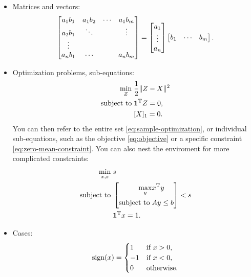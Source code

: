 \documentclass[letterpaper, 10 pt, conference]{ieeeconf}
\begin{document}
\begin{itemize}
\item Matrices and vectors:
  \begin{equation}
    \begin{bmatrix}
      a_1b_1 & a_1b_2 & \cdots &a_1 b_m\\
      a_2b_1 & \ddots && \vdots\\
      \vdots\\
      a_nb_1&\cdots&&a_nb_m
    \end{bmatrix}=\begin{bmatrix}a_1\\\vdots\\a_n\end{bmatrix}\begin{bmatrix}b_1 & \cdots & b_m\end{bmatrix}.
  \end{equation}
\item Optimization problems, sub-equations:
  \begin{subequations}
    \label{eq:sample-optimization}
    \begin{align}
      \min_{Z}\; & \frac{1}{2}\lVert Z-X\rVert^2\label{eq:objective}\\
      \textrm{subject to}\; &   \mathbf{1}^\mathrm{T} Z=0,\label{eq:zero-mean-constraint}\\
                 & [X]_1=0.
    \end{align}
  \end{subequations}
  You can then refer to the entire set \eqref{eq:sample-optimization}, or individual sub-equations, such as the objective \eqref{eq:objective} or a specific constraint \eqref{eq:zero-mean-constraint}.
  You can also nest the  enviroment for more complicated constraints:
  \begin{equation}
    \label{eq:sample-optimization-complex}
    \begin{aligned}
      \min_{x,s}\; & s\\
      \textrm{subject to}\; & \left[
                   \begin{aligned}
                           \max_y &x^\mathrm{T} y\\
                           \textrm{subject to}\; & Ay\leq b
                         \end{aligned}
                   \right]<s\\
                 & \mathbf{1}^\mathrm{T} x=1.
    \end{aligned}
  \end{equation}

\item Cases:
  \begin{equation}\label{eq:sign-def}
    \operatorname{sign}(x)=
    \begin{cases}
      1 & \textrm{if } x>0,\\
      -1 & \textrm{if } x<0,\\
      0 & \textrm{otherwise}.
    \end{cases}
  \end{equation}
\end{itemize}
\end{document}
